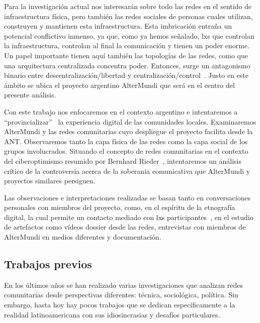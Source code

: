 Para la investigación actual nos interesarán sobre todo las redes en el sentido de infraestructura física, pero también las redes sociales de personas cuales utilizan, construyen y mantienen esta infraestructura.
Esta imbricación entraña un potencial conflictivo inmenso, ya que, como ya hemos señalado, lxs que controlan la infraestructura, controlan al final la comunicación y tienen un poder enorme.
Un papel importante tienen aquí también las topologías de las redes, como que una arquitectura centralizada concentra poder.
Entonces, surge un antagonismo binario entre descentralización/libertad y centralización/control~\autocite{FiTre2015}.
Justo en este ámbito se ubica el proyecto argentino AlterMundi que será en el centro del presente análisis.

Con este trabajo nos enfocaremos en el contexto argentino e intentaremos a ``provincializar''~\autocite{Coleman2010} la experiencia digital de las comunidades locales.
Examinaremos AlterMundi y las redes comunitarias cuyo despliegue el proyecto facilita desde la ANT.
Observaremos tanto la capa física de las redes como la capa social de los grupos involucrados.
Situando el concepto de redes comunitarias en el contexto del ciberoptimismo resumido por Bernhard Rieder~\autocite{Rieder2012}, intentaremos un análisis crítico de la controversia acerca de la soberania comunicativa que AlterMundi y proyectos similares persiguen.

Las observaciones e interpretaciones realizadas se basan tanto en conversaciones personales con miembros del proyecto, como, en el espíritu de la etnografía digital, la cual permite un contacto mediado con lxs participantes~\autocite{PHPHLT2016}, en el estudio de artefactos como vídeos dossier desde las redes, entrevistas con miembros de AlterMundi en medios diferentes y documentación.

\subsection{Trabajos previos}

En los últimos años se han realizado varias investigaciones que analizan redes comunitarias desde perspectivas diferentes: técnica, sociológica, política.
Sin embargo, hasta hoy hay pocos trabajos que se dedican específicamente a la realidad latinoamericana con sus idiosincrasias y desafíos particulares.

